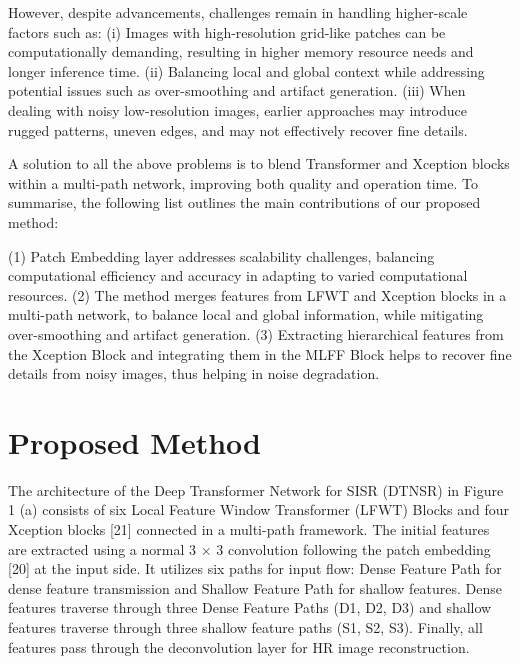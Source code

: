\documentclass[journal]{IEEEtran}
\begin{document}
However, despite advancements, challenges remain in handling higher-scale factors such as:
(i) Images with high-resolution grid-like patches can be computationally demanding, resulting in higher memory resource needs and longer inference time. 
(ii) Balancing local and global context while addressing potential issues such as over-smoothing and artifact generation. 
(iii) When dealing with noisy low-resolution images, earlier approaches may introduce rugged patterns, uneven edges, and may not effectively recover fine details.

A solution to all the above problems is to blend Transformer and Xception blocks within a multi-path network, improving both quality and operation time. To summarise, the following list outlines the main contributions of our proposed method:

(1) Patch Embedding layer addresses scalability challenges, balancing computational efficiency and accuracy in adapting to varied computational resources.
(2) The method merges features from LFWT and Xception blocks in a multi-path network, to balance local and global information, while mitigating over-smoothing and artifact generation.
(3) Extracting hierarchical features from the Xception Block and integrating them in the MLFF Block helps to recover fine details from noisy images, thus helping in noise degradation.

\section{Proposed Method}

The architecture of the Deep Transformer Network for SISR (DTNSR) in Figure 1 (a) consists of six  Local Feature Window Transformer (LFWT) Blocks and four Xception blocks [21] connected in a multi-path framework. The initial features are extracted using a normal 3 $\times$ 3 convolution following the patch embedding [20] at the input side. It utilizes six paths for input flow: Dense Feature Path for dense feature transmission and Shallow Feature Path for shallow features. Dense features traverse through three Dense Feature Paths (D1, D2, D3) and shallow features traverse through three shallow feature paths (S1, S2, S3). Finally, all features pass through the deconvolution layer for HR image reconstruction.
\end{document}
